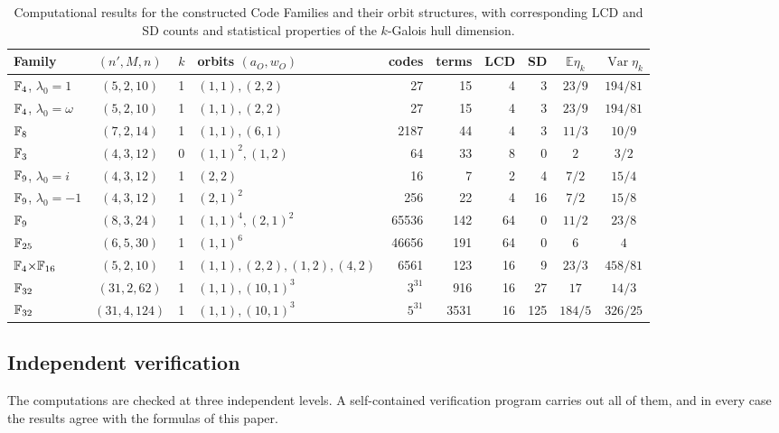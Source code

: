 \begin{table}[!t]
\centering
\scriptsize
\setlength{\tabcolsep}{2.5pt}
\caption{Computational results for the constructed Code Families and their orbit structures, with corresponding LCD and SD counts and statistical properties of the \(k\)-Galois hull dimension.}
\label{tab:summary}
\begin{tabular}{lcclrrrrcc}
\toprule
Family & $(n',M,n)$ & $k$ & orbits $(a_O,w_O)$ & codes & terms & LCD & SD &
$\mathbb{E}\eta_k$ & $\operatorname{Var}\eta_k$\\
\midrule
$\mathbb F_4$, $\lambda_0{=}1$ & $(5,2,10)$ & 1 & $(1,1),(2,2)$ & 27 & 15 & 4 & 3 & $23/9$ & $194/81$\\
$\mathbb F_4$, $\lambda_0{=}\omega$ & $(5,2,10)$ & 1 & $(1,1),(2,2)$ & 27 & 15 & 4 & 3 & $23/9$ & $194/81$\\
$\mathbb F_8$ & $(7,2,14)$ & 1 & $(1,1),(6,1)$ & 2187 & 44 & 4 & 3 & $11/3$ & $10/9$\\
$\mathbb F_3$ & $(4,3,12)$ & 0 & $(1,1)^2,(1,2)$ & 64 & 33 & 8 & 0 & $2$ & $3/2$\\
$\mathbb F_9$, $\lambda_0{=}i$ & $(4,3,12)$ & 1 & $(2,2)$ & 16 & 7 & 2 & 4 & $7/2$ & $15/4$\\
$\mathbb F_9$, $\lambda_0{=}-1$ & $(4,3,12)$ & 1 & $(2,1)^2$ & 256 & 22 & 4 & 16 & $7/2$ & $15/8$\\
$\mathbb F_9$ & $(8,3,24)$ & 1 & $(1,1)^4,(2,1)^2$ & 65536 & 142 & 64 & 0 & $11/2$ & $23/8$\\
$\mathbb F_{25}$ & $(6,5,30)$ & 1 & $(1,1)^6$ & 46656 & 191 & 64 & 0 & $6$ & $4$\\
$\mathbb F_4{\times}\mathbb F_{16}$ & $(5,2,10)$ & 1 & $(1,1),(2,2),(1,2),(4,2)$ & 6561 & 123 & 16 & 9 & $23/3$ & $458/81$\\
$\mathbb F_{32}$ & $(31,2,62)$ & 1 & $(1,1),(10,1)^3$ & $3^{31}$ & 916 & 16 & 27 & $17$ & $14/3$\\
$\mathbb F_{32}$ & $(31,4,124)$ & 1 & $(1,1),(10,1)^3$ & $5^{31}$ & 3531 & 16 & 125 & $184/5$ & $326/25$\\
\bottomrule
\end{tabular}
\end{table}

\subsection{Independent verification}\label{sec:verification}
The computations are checked at three independent levels.  A self-contained
verification program carries out all of them, and in every case the results
agree with the formulas of this paper.

